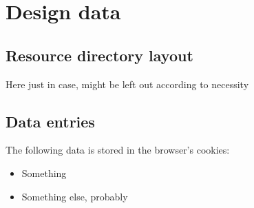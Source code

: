 \section{Design data}

\subsection{Resource directory layout}
Here just in case, might be left out according to necessity \\



\subsection{Data entries}
The following data is stored in the browser's cookies:
\begin{itemize}
  \item Something
  \item Something else, probably
\end{itemize}
